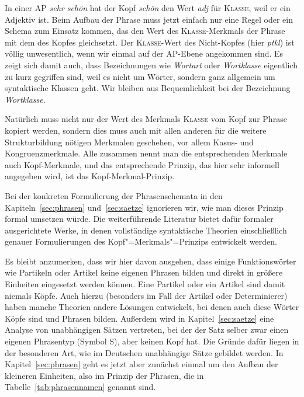 In einer AP \textit{sehr schön} hat der Kopf \textit{schön} den Wert \textit{adj} für \textsc{Klasse}, weil er ein Adjektiv ist.
Beim Aufbau der Phrase muss jetzt einfach nur eine Regel oder ein Schema zum Einsatz kommen, das den Wert des \textsc{Klasse}-Merkmals der Phrase mit dem des Kopfes gleichsetzt.
Der \textsc{Klasse}-Wert des Nicht-Kopfes (hier \textit{ptkl}) ist völlig unwesentlich, wenn wir einmal auf der AP-Ebene angekommen sind.
Es zeigt sich damit auch, dass Bezeichnungen wie \textit{Wortart} oder \textit{Wortklasse} eigentlich zu kurz gegriffen sind, weil es nicht um Wörter, sondern ganz allgemein um syntaktische Klassen geht.
Wir bleiben aus Bequemlichkeit bei der Bezeichnung \textit{Wortklasse}.

Natürlich muss nicht nur der Wert des Merkmals \textsc{Klasse} vom Kopf zur Phrase kopiert werden, sondern dies muss auch mit allen anderen für die weitere Strukturbildung nötigen Merkmalen geschehen, vor allem Kasus- und Kongruenzmerkmale.
Alle zusammen nennt man die entsprechenden Merkmale auch Kopf-Merkmale, und das entsprechende Prinzip, das hier sehr informell angegeben wird, ist das Kopf-Merkmal-Prinzip.


Bei der konkreten Formulierung der Phrasenschemata in den Kapiteln~\ref{sec:phrasen} und~\ref{sec:saetze} ignorieren wir, wie man dieses Prinzip formal umsetzen würde.
Die weiterführende Literatur bietet dafür formaler ausgerichtete Werke, in denen vollständige syntaktische Theorien einschließlich genauer Formulierungen des Kopf"=Merkmals"=Prinzips entwickelt werden.

Es bleibt anzumerken, dass wir hier davon ausgehen, dass einige Funktionswörter wie Partikeln oder Artikel keine eigenen Phrasen bilden und direkt in größere Einheiten eingesetzt werden können.
Eine Partikel oder ein Artikel sind damit niemals Köpfe.
Auch hierzu (besonders im Fall der Artikel oder Determinierer) haben manche Theorien andere Lösungen entwickelt, bei denen auch diese Wörter Köpfe sind und Phrasen bilden.
Außerdem wird in Kapitel~\ref{sec:saetze} eine Analyse von unabhängigen Sätzen vertreten, bei der der Satz selber zwar einen eigenen Phrasentyp (Symbol S), aber keinen Kopf hat.
Die Gründe dafür liegen in der besonderen Art, wie im Deutschen unabhängige Sätze gebildet werden.
In Kapitel~\ref{sec:phrasen} geht es jetzt aber zunächst einmal um den Aufbau der kleineren Einheiten, also im Prinzip der Phrasen, die in Tabelle~\ref{tab:phrasennamen} genannt sind.

